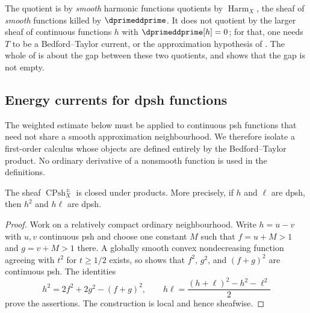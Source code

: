\begin{warning}{The quotient is by \emph{smooth} harmonic functions}
 quotients by $\operatorname{Harm}_X$, the
sheaf of \emph{smooth} functions killed by $\dprimeddprime$.  It does not
quotient by the larger sheaf of continuous functions $h$ with
$\dprimeddprime[h]=0$; for that, one needs $T$ to be a Bedford--Taylor
current, or the approximation hypothesis of
.  The whole of
 is about the gap between these two
quotients, and  shows that the gap is not empty.
\end{warning}

\subsection{Energy currents for dpsh functions}
\label{sec:ch16-energy-currents}

The weighted estimate below must be applied to continuous psh functions that
need not share a smooth approximation neighbourhood.  We therefore isolate a
first-order calculus whose objects are defined entirely by the
Bedford--Taylor product.  No ordinary derivative of a nonsmooth function is
used in the definitions.

\begin{lemma}
\label{lem:ch16-dpsh-algebra}
The sheaf $\operatorname{CPsh}^{\pm}_X$ is closed under products.  More
precisely, if $h$ and $\ell$ are dpsh, then $h^2$ and $h\ell$ are dpsh.
\end{lemma}

\begin{proof}
Work on a relatively compact ordinary neighbourhood.  Write $h=u-v$ with
$u,v$ continuous psh and choose one constant $M$ such that
$f=u+M>1$ and $g=v+M>1$ there.  A globally smooth convex nondecreasing
function agreeing with $t^2$ for $t\geq1/2$ exists, so
 shows that $f^2$, $g^2$, and $(f+g)^2$ are
continuous psh.  The identities
\[
 h^2=2f^2+2g^2-(f+g)^2,
 \qquad
 h\ell=\frac{(h+\ell)^2-h^2-\ell^2}{2}
\]
prove the assertions.  The construction is local and hence sheafwise.
\end{proof}

